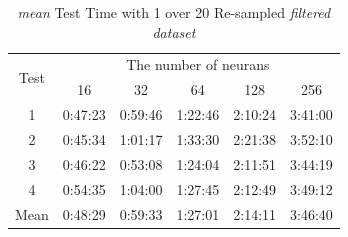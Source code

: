 \documentclass[draft,dvipsnames]{drexel-thesis}
\begin{document}
\begin{thesis}
\begin{table}[!t]
\centering
\caption{{\em mean} Test Time with 1 over 20 Re-sampled {\em filtered dataset}}
\label{tbl:mean_1_20_time}
\begin{tabular}{|c|c|c|c|c|c|}
\hline
\multirow{2}{*}{Test}      & \multicolumn{5}{c|}{The number of neurans}                                                                                                               \\ \cline{2-6} 
                           & 16                           & 32                           & 64                           & 128                          & 256                          \\ \hline
1                          & 0:47:23                      & 0:59:46                      & 1:22:46                      & 2:10:24                      & 3:41:00                      \\ \hline
2                          & 0:45:34                      & 1:01:17                      & 1:33:30                      & 2:21:38                      & 3:52:10                      \\ \hline
3                          & 0:46:22                      & 0:53:08                      & 1:24:04                      & 2:11:51                      & 3:44:19                      \\ \hline
4                          & 0:54:35                      & 1:04:00                      & 1:27:45                      & 2:12:49                      & 3:49:12                      \\ \hline
\multicolumn{1}{|l|}{Mean} & \multicolumn{1}{l|}{0:48:29} & \multicolumn{1}{l|}{0:59:33} & \multicolumn{1}{l|}{1:27:01} & \multicolumn{1}{l|}{2:14:11} & \multicolumn{1}{l|}{3:46:40} \\ \hline
\end{tabular}
\end{table}


\end{thesis}
\end{document}

